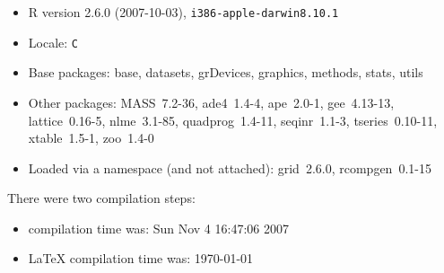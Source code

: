 \documentclass{article}
\begin{document}
\begin{itemize}
  \item R version 2.6.0 (2007-10-03), \verb|i386-apple-darwin8.10.1|
  \item Locale: \verb|C|
  \item Base packages: base, datasets, grDevices, graphics, methods,
    stats, utils
  \item Other packages: MASS~7.2-36, ade4~1.4-4, ape~2.0-1,
    gee~4.13-13, lattice~0.16-5, nlme~3.1-85, quadprog~1.4-11,
    seqinr~1.1-3, tseries~0.10-11, xtable~1.5-1, zoo~1.4-0
  \item Loaded via a namespace (and not attached): grid~2.6.0,
    rcompgen~0.1-15
\end{itemize}
There were two compilation steps:

\begin{itemize}
  \item \Rlogo{} compilation time was: Sun Nov  4 16:47:06 2007
  \item \LaTeX{} compilation time was: \today
\end{itemize}



\clearpage
{}


\end{document}
